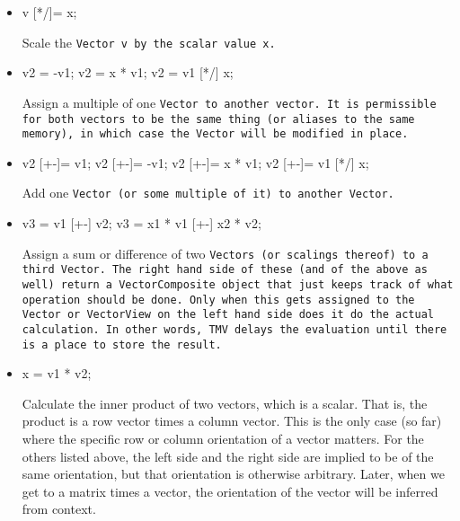 \begin{itemize}

\item
\begin{tmvcode}
v [*/]= x;
\end{tmvcode}
Scale the \tt{Vector v} by the scalar value \tt{x}.

\item
\begin{tmvcode}
v2 = -v1;
v2 = x * v1;
v2 = v1 [*/] x;
\end{tmvcode}
Assign a multiple of one \tt{Vector} to another vector.  It is permissible for both vectors to be the same thing (or aliases to the same memory), in which case the \tt{Vector} will be modified in place.

\item
\begin{tmvcode}
v2 [+-]= v1;
v2 [+-]= -v1;
v2 [+-]= x * v1;
v2 [+-]= v1 [*/] x;
\end{tmvcode}
Add one \tt{Vector} (or some multiple of it) to another \tt{Vector}.

\item
\begin{tmvcode}
v3 = v1 [+-] v2;
v3 = x1 * v1 [+-] x2 * v2;
\end{tmvcode}
Assign a sum or difference of two \tt{Vectors} (or scalings thereof) to a third \tt{Vector}.
The right hand side of these (and of the above as well) return a \tt{VectorComposite} object that just keeps track of what operation should be done.  Only when this gets assigned to the \tt{Vector} or \tt{VectorView} on the left hand side does it do the actual calculation.  In other words, TMV delays the evaluation until there is a place to store the result.

\item
\begin{tmvcode}
x = v1 * v2;
\end{tmvcode}
Calculate the inner product of two vectors, which is a scalar.  That is, the product
is a row vector times a column vector.  
This is the only case (so far)
where the specific row or column orientation of a vector matters.  For the others
listed above, the left side and the right side are implied to be of the same orientation, but
that orientation is otherwise arbitrary.
Later, when we get to a matrix times a vector, the orientation 
of the vector will be inferred from context.

\end{itemize}

